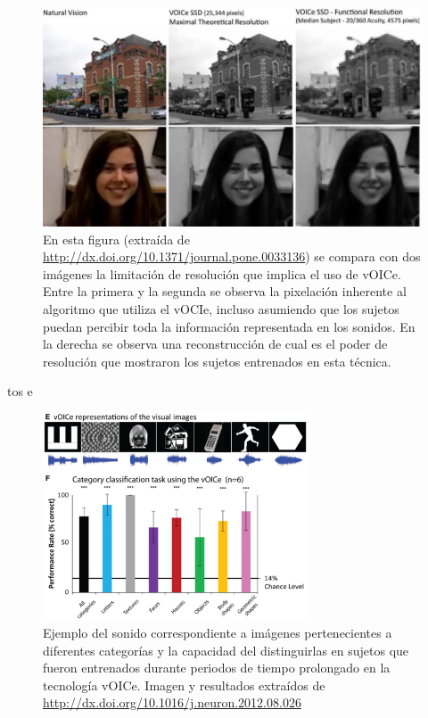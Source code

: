\documentclass{article}
\begin{document}
    \begin{figure}
        \center
        \includegraphics[width=\textwidth]{Imagenes/ImagenVoice1.png}
        \caption{En esta figura (extraída de \url{http://dx.doi.org/10.1371/journal.pone.0033136}) se compara con dos imágenes la limitación de resolución que implica el uso de vOICe. Entre la primera y la segunda se observa la pixelación inherente al algoritmo que utiliza el vOCIe, incluso asumiendo que los sujetos puedan percibir toda la información representada en los sonidos. En la derecha se observa una reconstrucción de cual es el poder de resolución que mostraron los sujetos entrenados en esta técnica.}    
        \label{fig:Voice1}
    \end{figure}
tos e    
    \begin{figure}
        \center
        \includegraphics[width=0.7\textwidth]{Imagenes/Voice3.png}
        \caption{Ejemplo del sonido correspondiente a imágenes pertenecientes a diferentes categorías y la capacidad del distinguirlas en sujetos que fueron entrenados durante periodos de tiempo prolongado en la tecnología vOICe. Imagen y resultados extraídos de \url{http://dx.doi.org/10.1016/j.neuron.2012.08.026}}
        \label{fig:Voice3}
    \end{figure}
    
\end{document}
